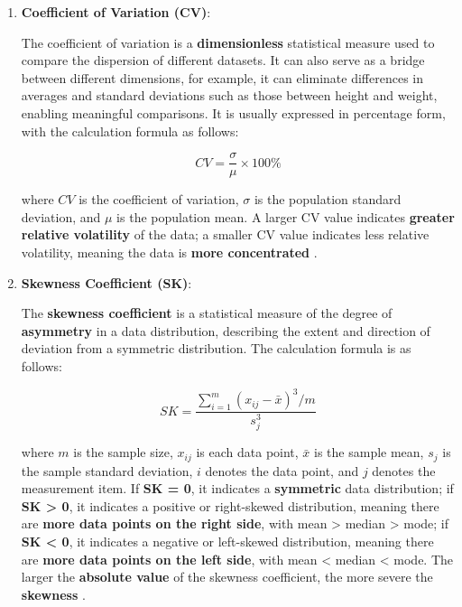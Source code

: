 \documentclass{article}
\begin{document}
	\begin{enumerate}
		\item \textbf{Coefficient of Variation (CV)}:
		
		The coefficient of variation is a \textbf{dimensionless} statistical measure used to compare the dispersion of different datasets. It can also serve as a bridge between different dimensions, for example, it can eliminate differences in averages and standard deviations such as those between height and weight, enabling meaningful comparisons. It is usually expressed in percentage form, with the calculation formula as follows:
		
		\begin{equation}
			CV = \frac{\sigma}{\mu} \times 100\%
			\label{eq:cv}
		\end{equation}
		
		where \(CV\) is the coefficient of variation, \(\sigma\) is the population standard deviation, and \(\mu\) is the population mean. A larger CV value indicates \textbf{greater relative volatility} of the data; a smaller CV value indicates less relative volatility, meaning the data is \textbf{more concentrated} \cite{2}.
		
		\item \textbf{Skewness Coefficient (SK)}:
		
		The \textbf{skewness coefficient} is a statistical measure of the degree of \textbf{asymmetry} in a data distribution, describing the extent and direction of deviation from a symmetric distribution. The calculation formula is as follows:
		
		\begin{equation}
			SK = \frac{\sum_{i=1}^{m} (x_{ij} - \bar{x})^3 / m}{s_j^3}
			\label{eq:sk}
		\end{equation}
		
		where \(m\) is the sample size, \(x_{ij}\) is each data point, \(\bar{x}\) is the sample mean, \(s_j\) is the sample standard deviation, \(i\) denotes the data point, and \(j\) denotes the measurement item. If \textbf{SK = 0}, it indicates a \textbf{symmetric} data distribution; if \textbf{SK > 0}, it indicates a positive or right-skewed distribution, meaning there are \textbf{more data points on the right side}, with mean > median > mode; if \textbf{SK < 0}, it indicates a negative or left-skewed distribution, meaning there are \textbf{more data points on the left side}, with mean < median < mode. The larger the \textbf{absolute value} of the skewness coefficient, the more severe the \textbf{skewness} \cite{3}.
		

\end{enumerate}
\end{document}

